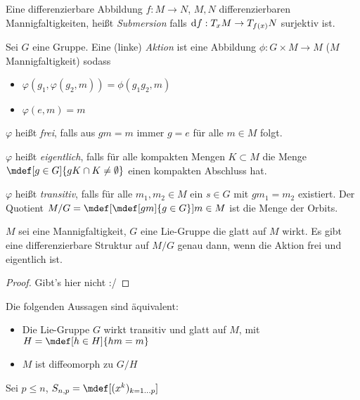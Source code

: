 \begin{dfn}
   Eine differenzierbare Abbildung $f : M \to N$, $M,N$ differenzierbaren
   Mannigfaltigkeiten, heißt \emph{Submersion} falls $\mathrm d f : T_x M \to
   T_{f(x)}N$ surjektiv ist.
\end{dfn}

\begin{dfn}
  Sei $G$ eine Gruppe. Eine (linke) \emph{Aktion} ist eine Abbildung $\phi:
  G\times M \to M$ ($M$ Mannigfaltigkeit) sodass
  \begin{itemize}
    \item $\varphi(g_1, \varphi(g_2, m)) = \phi(g_1g_2, m)$
    \item $\varphi(e, m) = m$
  \end{itemize}

  $\varphi$ heißt \emph{frei}, falls aus $gm = m$ immer $g = e$ für alle $m\in
  M$ folgt.

  $\varphi$ heißt \emph{eigentlich}, falls für alle kompakten Mengen
  $K\subset M$ die Menge $\mdef[g\in G]{gK\cap K \neq \emptyset}$ einen
  kompakten Abschluss hat.

  $\varphi$ heißt \emph{transitiv}, falls für alle $m_1, m_2 \in M$ ein $s\in G$
  mit $gm_1 = m_2$ existiert. Der Quotient $M/G = \mdef[\mdef[gm]{g\in G}]{m\in
  M}$ ist die Menge der Orbits.
\end{dfn}

\begin{stz}
  $M$ sei eine Mannigfaltigkeit, $G$ eine Lie-Gruppe die glatt auf $M$ wirkt. Es
  gibt eine differenzierbare Struktur auf $M/G$ genau dann, wenn die Aktion frei
  und eigentlich ist.
  \begin{proof}
    Gibt's hier nicht :/
  \end{proof}
\end{stz}


\begin{stz}
  Die folgenden Aussagen sind äquivalent:
  \begin{itemize}
    \item Die Lie-Gruppe $G$ wirkt transitiv und glatt auf $M$, mit $H =
      \mdef[h\in H]{hm = m}$
    \item $M$ ist diffeomorph zu $G/H$
  \end{itemize}
\end{stz}

\begin{bsp}
  Sei $p\leq n$, $S_{n,p} = \mdef[(x^k)_{k=1\dots p}]{}$
  
\end{bsp}
